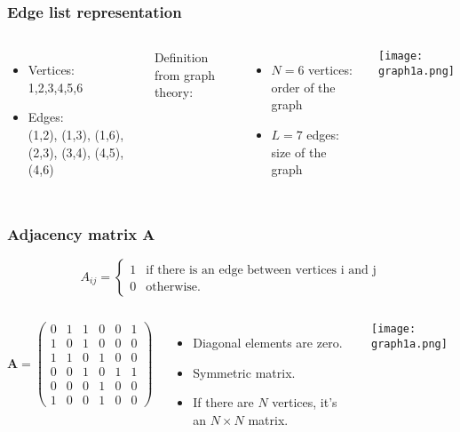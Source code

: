\documentclass[10pt,aspectratio=169,dvipsnames]{beamer}
\let\olditem\item
\renewcommand{\item}{%
\olditem\vspace{5pt}}
\begin{document}
\begin{frame}
\frametitle{Edge list representation}
  \begin{columns}
\begin{itemize}
\item Vertices:\\
1,2,3,4,5,6\\
\item Edges:\\
(1,2), (1,3), (1,6), (2,3), (3,4), (4,5), (4,6)
\end{itemize}
Definition from graph theory:
\begin{itemize}
\item $N=6$ vertices: \alert{order} of the graph\\
\item $L=7$ edges: \alert{size} of the graph
\end{itemize}
\texttt{[image: graph1a.png]}
  \end{columns}
\end{frame}
\begin{frame}
\frametitle{Adjacency matrix $\mathbf{A}$}
\begin{equation*}
A_{ij} = \begin{cases} 1 &\mbox{if there is an edge between vertices i and j} \\
0 & \mbox{otherwise}. \end{cases}
\end{equation*}
\begin{columns}
\begin{equation*}
\mathbf{A}=\left(\begin{matrix}
0 & 1 & 1 & 0 & 0 & 1\\
1 & 0 & 1 & 0 & 0 & 0\\
1 & 1 & 0 & 1 & 0 & 0\\
0 & 0 & 1 & 0 & 1 & 1\\
0 & 0 & 0 & 1 & 0 & 0\\
1 & 0 & 0 & 1 & 0 & 0
\end{matrix}\right)
\end{equation*}
\begin{itemize}
\item Diagonal elements are zero.
\item Symmetric matrix.
\item If there are $N$ vertices, it's an $N\times N$ matrix.
\end{itemize}
\texttt{[image: graph1a.png]}
  \end{columns}
\end{frame}
\end{document}
